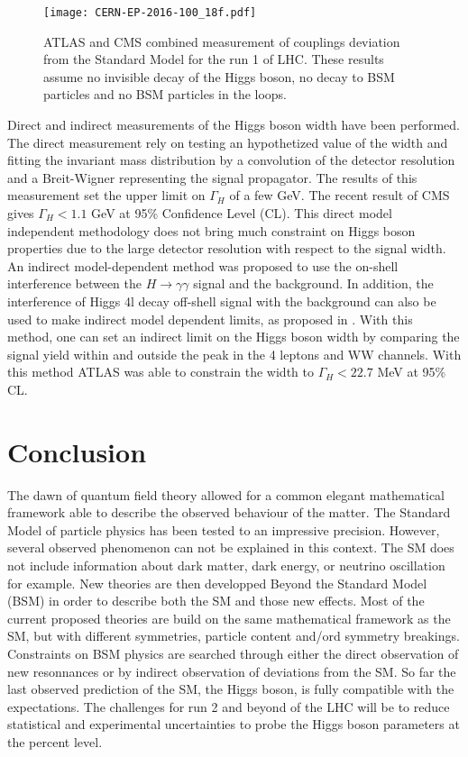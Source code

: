 \begin{figure}[htbp]
\centering
\texttt{[image: CERN-EP-2016-100\_18f.pdf]}
\caption{\label{fig:orgfd66e48}
ATLAS and CMS combined measurement of couplings deviation from the Standard Model for the run 1 of LHC. These results assume no invisible decay of the Higgs boson, no decay to BSM particles and no BSM particles in the loops. \cite{CERN-EP-2016-100}}
\end{figure}

Direct and indirect measurements of the Higgs boson width have been performed.
The direct measurement rely on testing an hypothetized value of the width and fitting the invariant mass distribution by a convolution of the detector resolution and a Breit-Wigner representing the signal propagator.
The results of this measurement \cite{CERN-THESIS-2015-193,CERN-PH-EP-2014-122} set the upper limit on $\Gamma_H$ of a few GeV.
The recent result of CMS \cite{CMS-PAS-HIG-16-041,CMS-HIG-16-041} gives $\Gamma_H < 1.1$ GeV at 95\% Confidence Level (CL).
This direct model independent methodology does not bring much constraint on Higgs boson properties due to the large detector resolution with respect to the signal width.
An indirect model-dependent method was proposed \cite{Dixon:2013haa} to use the on-shell interference between the \(H\rightarrow\gamma\gamma\) signal and the background.
In addition, the interference of Higgs 4l decay off-shell signal with the background can also be used to make indirect model dependent limits, as proposed in \cite{Caola:2013yja}.
With this method, one can set an indirect limit on the Higgs boson width by comparing the signal yield within and outside the peak in the 4 leptons and WW channels.
With this method ATLAS \cite{ATLAS-CONF-2014-042,CERN-PH-EP-2015-026} was able to constrain the width to $\Gamma_H <22.7$ MeV at 95\% CL.




\section{Conclusion}
\label{sec:org69deba1}
The dawn of quantum field theory allowed for a common elegant mathematical framework able to describe the observed behaviour of the matter.
The Standard Model of particle physics has been tested to an impressive precision.
However, several observed phenomenon can not be explained in this context.
The SM does not include information about dark matter, dark energy, or neutrino oscillation for example.
New theories are then developped Beyond the Standard Model (BSM) in order to describe both the SM and those new effects.
Most of the current proposed theories are build on the same mathematical framework as the SM, but with different symmetries, particle content and/ord symmetry breakings.
Constraints on BSM physics are searched through either the direct observation of new resonnances or by indirect observation of deviations from the SM.
So far the last observed prediction of the SM, the Higgs boson, is fully compatible with the expectations.
The challenges for run 2 and beyond of the LHC will be to reduce statistical and experimental uncertainties to probe the Higgs boson parameters at the percent level.
